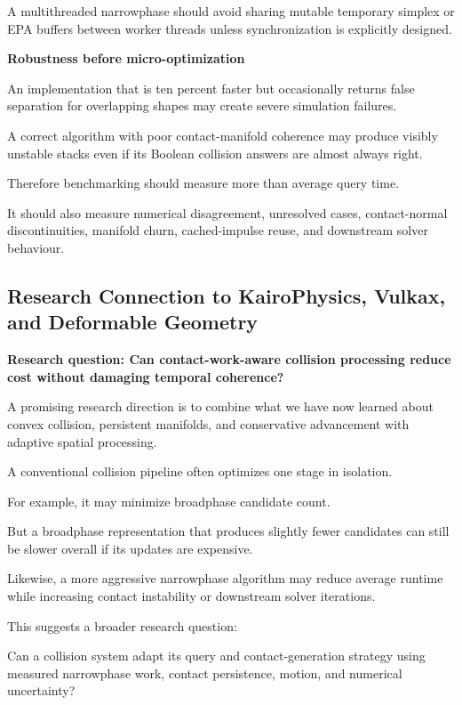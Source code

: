 A multithreaded narrowphase should avoid sharing mutable temporary simplex or EPA buffers between worker threads unless synchronization is explicitly designed.

\textbf{Robustness before micro-optimization}

An implementation that is ten percent faster but occasionally returns false separation for overlapping shapes may create severe simulation failures.

A correct algorithm with poor contact-manifold coherence may produce visibly unstable stacks even if its Boolean collision answers are almost always right.

Therefore benchmarking should measure more than average query time.

It should also measure numerical disagreement, unresolved cases, contact-normal discontinuities, manifold churn, cached-impulse reuse, and downstream solver behaviour.

\subsection{Research Connection to KairoPhysics, Vulkax, and Deformable Geometry}\label{04-visual-computing-ii-ch026-research-connection-to-kairophysics-vulkax-and-deformable-geometry}

\textbf{Research question: Can contact-work-aware collision processing reduce cost without damaging temporal coherence?}

A promising research direction is to combine what we have now learned about convex collision, persistent manifolds, and conservative advancement with adaptive spatial processing.

A conventional collision pipeline often optimizes one stage in isolation.

For example, it may minimize broadphase candidate count.

But a broadphase representation that produces slightly fewer candidates can still be slower overall if its updates are expensive.

Likewise, a more aggressive narrowphase algorithm may reduce average runtime while increasing contact instability or downstream solver iterations.

This suggests a broader research question:

Can a collision system adapt its query and contact-generation strategy using measured narrowphase work, contact persistence, motion, and numerical uncertainty?

